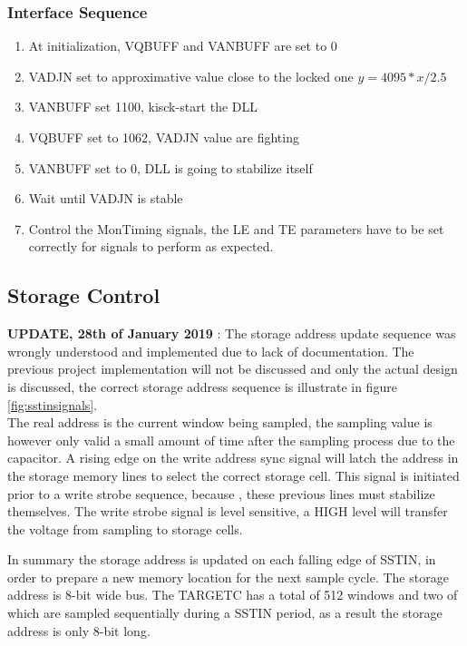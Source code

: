 \subsubsection*{Interface Sequence}
\begin{enumerate}
  \item At initialization, VQBUFF and VANBUFF are set to 0
  \item VADJN set to approximative value close to the locked one $y = 4095*x/2.5$
  \item VANBUFF set 1100, kisck-start the DLL
  \item VQBUFF set to 1062, VADJN value are fighting
  \item VANBUFF set to 0, DLL is going to stabilize itself
  \item Wait until VADJN is stable
  \item Control the MonTiming signals, the LE and TE parameters have to be set correctly for signals to perform as expected.
\end{enumerate}


\subsection{Storage Control}
\textbf{UPDATE, 28th of January 2019} : The storage address update sequence was wrongly understood and implemented due to lack of documentation. The previous project implementation will not be discussed and only the actual design is discussed, the correct storage address sequence is illustrate in figure \ref{fig:sstinsignals}.\\

\noindent
The real address is the current window being sampled, the sampling value is however only valid a small amount of time after the sampling process due to the capacitor. A rising edge on the write address sync signal will latch the address in the storage memory lines to select the correct storage cell. This signal is initiated prior to a write strobe sequence, because , these previous lines must stabilize themselves. The write strobe signal is level sensitive, a HIGH level will transfer the voltage from sampling to storage cells.

\noindent
In summary the storage address is updated on each falling edge of SSTIN, in order to prepare a new memory location for the next sample cycle. The storage address is 8-bit wide bus. The TARGETC has a total of 512 windows and two of which are sampled sequentially during a SSTIN period, as a result the storage address is only 8-bit long.

